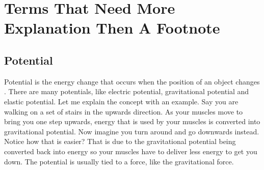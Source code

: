 \appendix
\appendixpage
\section{Terms That Need More Explanation Then A Footnote}
\subsection{Potential} \label{sec:potential}
Potential is the energy change that occurs when the position of an object changes \cite{potential}. There are many potentials, like electric potential, gravitational potential and elastic 
potential. Let me explain the concept with an example. Say you are walking on a set of stairs in the upwards direction. As your muscles move to bring you one step upwards, energy that is used
by your muscles is converted into gravitational potential. Now imagine you turn around and go downwards instead. Notice how that is easier? That is due to the gravitational potential being 
converted back into energy so your muscles have to deliver less energy to get you down. The potential is usually tied to a force, like the gravitational force.